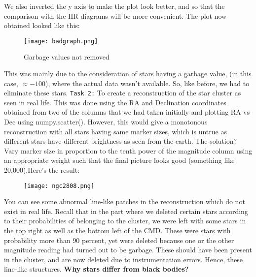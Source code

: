 \documentclass{article}
\begin{document}
We also inverted the y axis to make the plot look better, and so that the comparison with the HR diagrams will be more convenient.\newline
The plot now obtained looked like this:
\begin{figure}[H]
\caption{Garbage values not removed}
\centering
\texttt{[image: badgraph.png]}\newline
\end{figure}
This was mainly due to the consideration of stars having a garbage value, (in this case, $\approx -100$), where the actual data wasn't available. So, like before, we had to eliminate these stars.\newpage
\texttt{Task 2:} To create a reconstruction of the star cluster as seen in real life. This was done using the RA and Declination coordinates obtained from two of the columns that we had taken initially and plotting RA vs Dec using numpy.scatter(). However, this would give a monotonous reconstruction with all stars having same marker sizes, which is untrue as different stars have different brightness as seen from the earth. The solution? Vary marker size in proportion to the tenth power of the magnitude column using an appropriate weight such that the final picture looks good (something like 20,000).Here's the result:  
\begin{figure}[H]
\caption{}
\centering
\texttt{[image: ngc2808.png]}\newline
\end{figure}
\newline
You can see some abnormal line-like patches in the reconstruction which do not exist in real life. Recall that in the part where we deleted certain stars according to their probabilities of belonging to the cluster, we were left with some stars in the top right as well as the bottom left of the CMD. These were stars with probability more than 90 percent, yet were deleted because one or the other magnitude reading had turned out to be garbage. These should have been present in the cluster, and are now deleted due to instrumentation errors. Hence, these line-like structures.
\newline
\newpage
\textbf{\Large Why stars differ from black bodies?}\newline
\end{document}
